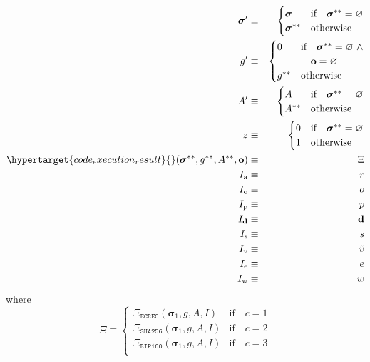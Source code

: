\documentclass[9pt,oneside]{amsart}
\begin{document}
\begin{multicols}{2}
\begin{eqnarray}
\boldsymbol{\sigma}' & \equiv & \begin{cases}
\boldsymbol{\sigma} & \text{if} \quad \boldsymbol{\sigma}^{**} = \varnothing \\
\boldsymbol{\sigma}^{**} & \text{otherwise}
\end{cases} \\
g' & \equiv & \begin{cases}
0 & \text{if} \quad \boldsymbol{\sigma}^{**} = \varnothing \ \wedge \\
&\quad \mathbf{o} = \varnothing \\
g^{**} & \text{otherwise}
\end{cases} \\
A' & \equiv & \begin{cases}
A & \text{if} \quad \boldsymbol{\sigma}^{**} = \varnothing \\
A^{**} & \text{otherwise}
\end{cases} \\
z & \equiv & \begin{cases}
0 & \text{if} \quad \boldsymbol{\sigma}^{**} = \varnothing \\
1 & \text{otherwise}
\end{cases} \\
\hypertarget{code_execution_result}{}
(\boldsymbol{\sigma}^{**}, g^{**}, A^{**}, \mathbf{o}) & \equiv & \Xi\\
I_{\mathrm{a}} & \equiv & r \\
I_{\mathrm{o}} & \equiv & o \\
I_{\mathrm{p}} & \equiv & p \\
I_{\mathbf{d}} & \equiv & \mathbf{d} \\
I_{\mathrm{s}} & \equiv & s \\
I_{\mathrm{v}} & \equiv & \tilde{v} \\
I_{\mathrm{e}} & \equiv & e \\
I_{\mathrm{w}} & \equiv & w
\end{eqnarray}
\nopagebreak[1]where
\begin{equation}
\Xi \equiv \begin{cases}
\Xi_{\mathtt{ECREC}}    (\boldsymbol{\sigma}_1, g, A, I) & \text{if} \quad c = 1 \\
\Xi_{\mathtt{SHA256}}   (\boldsymbol{\sigma}_1, g, A, I) & \text{if} \quad c = 2 \\
\Xi_{\mathtt{RIP160}}   (\boldsymbol{\sigma}_1, g, A, I) & \text{if} \quad c = 3 \\

\end{cases}
\end{equation}
\end{multicols}
\end{document}
